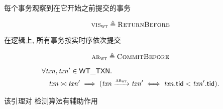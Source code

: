 \begin{frame}{}
  \begin{center}
	每个事务观察到在它开始之前提交的事务
  \end{center}

  \begin{definition}
	\[
	  \textsc{vis}_{\textsc{wt}} \triangleq \textsc{ReturnBefore}
	\]
  \end{definition}

  \vspace{0.80cm}
  \begin{center}
	在逻辑上, 所有事务按实时序依次提交
  \end{center}
  \begin{definition}
	\[
	  \textsc{ar}_{\textsc{wt}} \triangleq \textsc{CommitBefore}
	\]
  \end{definition}
\end{frame}

\begin{frame}{}
  \begin{lemma}[冲突事务的提交顺序]
	\vspace{-0.30cm}
    \begin{align*}
      &\forall \mathit{txn}, \mathit{txn}' \in {\sf WT\_TXN}.\; \\
        &\quad \mathit{txn} \bowtie \mathit{txn}' \implies (\mathit{txn} \xrightarrow{\textsc{ar}_{\textsc{wt}}} \mathit{txn}'
          \iff \mathit{txn}.{\sf tid} < \mathit{txn}'.{\sf tid}).
    \end{align*}
  \end{lemma}

  \vspace{0.60cm}
  \begin{center}
	该引理对 \strongsi{} 检测算法有辅助作用
  \end{center}
\end{frame}
